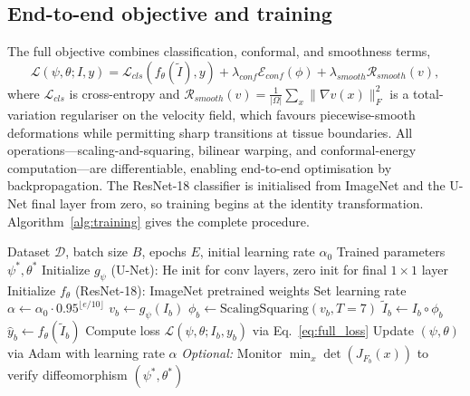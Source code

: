 \documentclass[pdflatex,sn-nature]{sn-jnl}%
\theoremstyle{thmstyleone}%
\theoremstyle{thmstyletwo}%
\theoremstyle{thmstylethree}%
\begin{document}
\subsection{End-to-end objective and training}

The full objective combines classification, conformal, and smoothness terms,
\begin{equation}
\mathcal{L}(\psi,\theta;I,y)=\mathcal{L}_{cls}(f_\theta(\tilde{I}),y)+\lambda_{conf}\mathcal{E}_{conf}(\phi)+\lambda_{smooth}\mathcal{R}_{smooth}(v),
\label{eq:full_loss}
\end{equation}
where $\mathcal{L}_{cls}$ is cross-entropy and
$\mathcal{R}_{smooth}(v)=\frac{1}{|\Omega|}\sum_{x}\|\nabla v(x)\|_F^2$ is a
total-variation regulariser on the velocity field, which favours piecewise-smooth
deformations while permitting sharp transitions at tissue boundaries. All
operations---scaling-and-squaring, bilinear warping, and conformal-energy
computation---are differentiable, enabling end-to-end optimisation by
backpropagation. The ResNet-18 classifier is initialised from ImageNet and the
U-Net final layer from zero, so training begins at the identity transformation.
Algorithm~\ref{alg:training} gives the complete procedure.

\begin{algorithm}[t]
\caption{DCA Training Procedure}
\label{alg:training}
\begin{algorithmic}[1]
\REQUIRE Dataset $\mathcal{D}$, batch size $B$, epochs $E$, initial learning rate $\alpha_0$
\ENSURE Trained parameters $\psi^*, \theta^*$
\STATE Initialize $g_\psi$ (U-Net): He init for conv layers, zero init for final $1 \times 1$ layer
\STATE Initialize $f_\theta$ (ResNet-18): ImageNet pretrained weights
    \STATE Set learning rate $\alpha \leftarrow \alpha_0 \cdot 0.95^{\lfloor e/10 \rfloor}$
        \STATE $v_b \leftarrow g_\psi(I_b)$ \quad {}
        \STATE $\phi_b \leftarrow \text{ScalingSquaring}(v_b, T=7)$ \quad {}
        \STATE $\tilde{I}_b \leftarrow I_b \circ \phi_b$ \quad {}
        \STATE $\hat{y}_b \leftarrow f_\theta(\tilde{I}_b)$ \quad {}
        \STATE Compute loss $\mathcal{L}(\psi, \theta; I_b, y_b)$ via Eq.~\eqref{eq:full_loss}
        \STATE Update $(\psi, \theta)$ via Adam with learning rate $\alpha$
        \STATE \textit{Optional:} Monitor $\min_x \det(J_{F_b}(x))$ to verify diffeomorphism
    \ENDFOR
\ENDFOR
\RETURN $(\psi^*, \theta^*)$
\end{algorithmic}
\end{algorithm}
\end{document}
